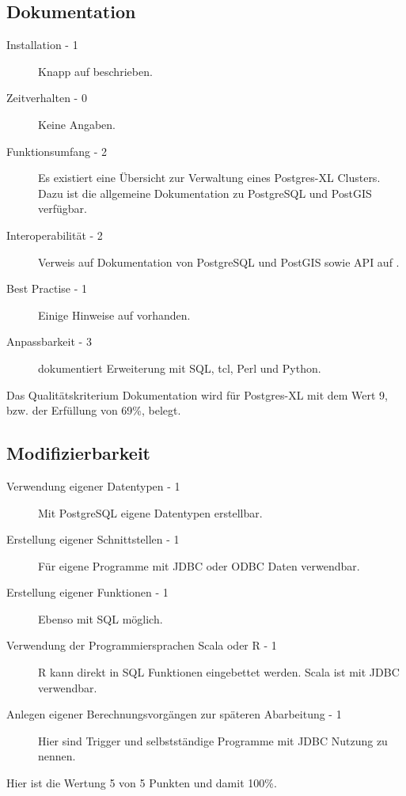 \subsection{Dokumentation}
\begin{description}
\item[Installation - 1] Knapp auf \cite{website:postgresxl-install} beschrieben.
\item[Zeitverhalten - 0] Keine Angaben.
\item[Funktionsumfang - 2] Es existiert eine Übersicht zur Verwaltung eines Postgres-XL Clusters. Dazu ist die allgemeine Dokumentation zu PostgreSQL und PostGIS verfügbar. \cite{website:postgresxl-manual}
\item[Interoperabilität - 2] Verweis auf Dokumentation von PostgreSQL und PostGIS sowie API auf \cite{website:postgresxl-api}.
\item[Best Practise - 1] Einige Hinweise auf \cite{website:postgresxl-manual} vorhanden.
\item[Anpassbarkeit - 3] \cite{website:postgresxl-extend} dokumentiert Erweiterung mit SQL, tcl, Perl und Python.
\end{description}
Das Qualitätskriterium Dokumentation wird für Postgres-XL mit dem Wert 9, bzw. der Erfüllung von 69\%,  belegt.

\subsection{Modifizierbarkeit}
\begin{description}
\item[Verwendung eigener Datentypen - 1] Mit PostgreSQL eigene Datentypen erstellbar.
\item[Erstellung eigener Schnittstellen - 1] Für eigene Programme mit JDBC oder ODBC Daten verwendbar.
\item[Erstellung eigener Funktionen - 1] Ebenso mit SQL möglich.
\item[Verwendung der Programmiersprachen Scala oder R - 1] R kann direkt in SQL Funktionen eingebettet werden. Scala ist mit JDBC verwendbar.
\item[Anlegen eigener Berechnungsvorgängen zur späteren Abarbeitung - 1] Hier sind Trigger und selbstständige Programme mit JDBC Nutzung zu nennen.
\end{description}
Hier ist die Wertung 5 von 5 Punkten und damit 100\%.

